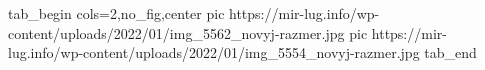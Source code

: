  
 
 
 
 

\ifcmt
  tab_begin cols=2,no_fig,center
     pic https://mir-lug.info/wp-content/uploads/2022/01/img_5562_novyj-razmer.jpg
		 pic https://mir-lug.info/wp-content/uploads/2022/01/img_5554_novyj-razmer.jpg
  tab_end
\fi
